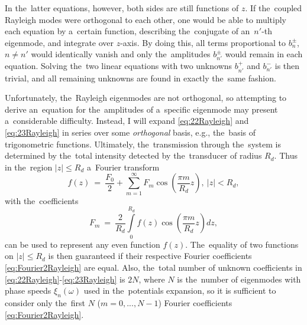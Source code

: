 In the~latter equations, however, both sides are still functions of $z$.
If the~coupled Rayleigh modes were orthogonal to each other, one would be able to multiply each equation by a~certain function, describing the~conjugate of an~$n'$-th eigenmode, and integrate over $z$-axis.
By doing this, all terms proportional to $b_n^{\pm}$, $n \neq n'$ would identically vanish and only the~amplitudes $b_{n'}^{\pm}$ would remain in each equation.
Solving the~two linear equations with two unknowns $b_{n'}^{+}$ and $b_{n'}^{-}$ is then trivial, and all remaining unknowns are found in exactly the~same fashion.

Unfortunately, the~Rayleigh eigenmodes are not orthogonal, so attempting to derive an~equation for the~amplitudes of a~specific eigenmode may present a~considerable difficulty.
Instead, I will expand \cref{eq:22Rayleigh} and \cref{eq:23Rayleigh} in series over some \textit{orthogonal} basis, e.g., the~basis of trigonometric functions.
Ultimately, the~transmission through the~system is determined by the~total intensity detected by the~transducer of radius $R_d$.
Thus in the~region $|z| \le R_d$ a~Fourier transform
\begin{equation}
\label{eq:Fourier1Rayleigh}
f(z)~=~\frac{F_0}{2}+\sum\limits_{m=1}^{\infty}F_m \cos\left(\frac{\pi m}{R_d}z\right),~|z|<R_d,
\end{equation}
with the~coefficients
\begin{equation}
\label{eq:Fourier2Rayleigh}
F_m~=~\frac{2}{R_d}\int\limits_{0}^{R_d}f(z)\cos\left(\frac{\pi m}{R_d}z\right)dz,
\end{equation}
can be used to represent any even function $f(z)$.
The~equality of two functions on $|z|\le R_d$ is then guaranteed if their respective Fourier coefficients \cref{eq:Fourier2Rayleigh} are equal.
Also, the~total number of unknown coefficients in \cref{eq:22Rayleigh}-\cref{eq:23Rayleigh} is $2N$, where $N$ is the~number of eigenmodes with phase speeds $\xi_n(\omega)$ used in the~potentials expansion, so it is sufficient to consider only the~first $N$ ($m=0,...,N-1$) Fourier coefficients \cref{eq:Fourier2Rayleigh}.

